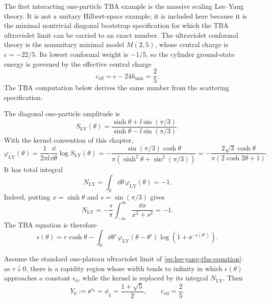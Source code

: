 The first interacting one-particle TBA example is the massive scaling
Lee--Yang theory.  It is not a unitary Hilbert-space example; it is included
here because it is the minimal nontrivial diagonal bootstrap specification for which
the TBA ultraviolet limit can be carried to an exact number.  The ultraviolet
conformal theory is the nonunitary minimal model \(M(2,5)\), whose central
charge is \(c=-22/5\).  Its lowest conformal weight is \(-1/5\), so the
cylinder ground-state energy is governed by the effective central charge
\[
  c_{\mathrm{eff}}=c-24h_{\min}=\frac25 .
\]
The TBA computation below derives the same number from the scattering specification.

The diagonal one-particle amplitude is
\[
  S_{\mathrm{LY}}(\theta)
  =
  \frac{\sinh\theta+\ii\sin(\pi/3)}
       {\sinh\theta-\ii\sin(\pi/3)} .
\]
With the kernel convention of this chapter,
\begin{equation}
  \varphi_{\mathrm{LY}}(\theta)
  =
  \frac{1}{2\pi\ii}\frac{\dd}{\dd\theta}\log S_{\mathrm{LY}}(\theta)
  =
  -\frac{\sin(\pi/3)\cosh\theta}
        {\pi\left(\sinh^2\theta+\sin^2(\pi/3)\right)}
  =
  -\frac{2\sqrt3\cosh\theta}{\pi(2\cosh 2\theta+1)} .
  \label{eq:lee-yang-tba-kernel}
\end{equation}
It has total integral
\begin{equation}
  N_{\mathrm{LY}}
  =
  \int_{\mathbb R}\dd\theta\,\varphi_{\mathrm{LY}}(\theta)
  =
  -1.
  \label{eq:lee-yang-kernel-integral}
\end{equation}
Indeed, putting \(x=\sinh\theta\) and \(s=\sin(\pi/3)\) gives
\[
  N_{\mathrm{LY}}
  =
  -\frac{s}{\pi}
  \int_{-\infty}^{\infty}\frac{\dd x}{x^2+s^2}
  =
  -1.
\]
The TBA equation is therefore
\begin{equation}
  \epsilon(\theta)
  =
  r\cosh\theta
  -\int_{\mathbb R}\dd\theta'\,
  \varphi_{\mathrm{LY}}(\theta-\theta')
  \log(1+\ee^{-\epsilon(\theta')}).
  \label{eq:lee-yang-tba-equation}
\end{equation}

\begin{controlledapproximation}
\label{ca:lee-yang-tba-effective-central-charge}
Assume the standard one-plateau ultraviolet limit of
\eqref{eq:lee-yang-tba-equation}: as \(r\downarrow0\), there is a rapidity
region whose width tends to infinity in which
\(\epsilon(\theta)\) approaches a constant \(\epsilon_0\), while the kernel is
replaced by its integral \(N_{\mathrm{LY}}\).  Then
\[
  Y_0:=\ee^{\epsilon_0}=\phi_{\mathrm g}
  =
  \frac{1+\sqrt5}{2},
  \qquad
  c_{\mathrm{eff}}=\frac25 .
\]
\end{controlledapproximation}

